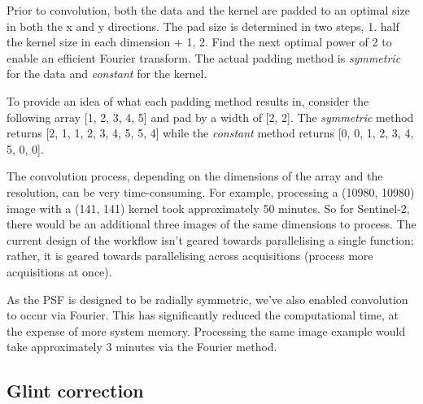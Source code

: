 \documentclass[a4paper]{article}
\begin{document}
\begin{flushleft}
    \clearpage

      Prior to convolution, both the data and the kernel are padded to an optimal size in both the x and y directions. The pad size is determined in two steps, 1. half the kernel size in each dimension + 1, 2. Find the next optimal power of 2 to enable an efficient Fourier transform. The actual padding method is \textit{symmetric} for the data and \textit{constant} for the kernel. \par
      To provide an idea of what each padding method results in, consider the following array [1, 2, 3, 4, 5] and pad by a width of [2, 2]. The \textit{symmetric} method returns [2, 1, 1, 2, 3, 4, 5, 5, 4] while the \textit{constant} method returns [0, 0, 1, 2, 3, 4, 5, 0, 0]. \par
      The convolution process, depending on the dimensions of the array and the resolution, can be very time-consuming. For example, processing a (10980, 10980) image with a (141, 141) kernel took approximately 50 minutes. So for Sentinel-2, there would be an additional three images of the same dimensions to process. The current design of the workflow isn't geared towards parallelising a single function; rather, it is geared towards parallelising across acquisitions (process more acquisitions at once). \par
      As the PSF is designed to be radially symmetric, we've also enabled convolution to occur via Fourier. This has significantly reduced the computational time, at the expense of more system memory. Processing the same image example would take approximately 3 minutes via the Fourier method.
    \end{flushleft}

  \subsection{Glint correction}
\end{document}
